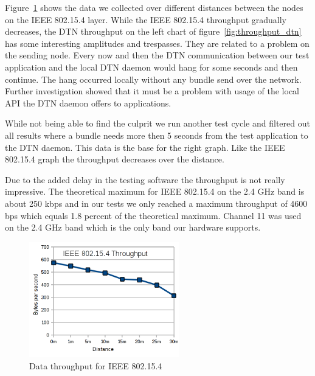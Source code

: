 Figure~\ref{fig:throughput} shows the data we collected over different distances
between the nodes on the IEEE 802.15.4 layer. While the IEEE 802.15.4 throughput
gradually decreases, the DTN throughput on the left chart of figure~\ref{fig:throughput_dtn}
has some interesting amplitudes and trespasses. They
are related to a problem on the sending node. Every now and then the DTN
communication between our test application and the local DTN daemon would hang
for some seconds and then continue. The hang occurred locally without any bundle
send over the network. Further investigation showed that it must be a problem
with usage of the local API the DTN daemon offers to applications.

While not being able to find the culprit we run another test  cycle and filtered
out all results where a bundle needs more then 5 seconds from the test
application to the DTN daemon. This data is the base for the right graph. Like
the IEEE 802.15.4 graph the throughput decreases over the distance.

Due to the added delay in the testing software the throughput is
not really impressive. The theoretical maximum for IEEE 802.15.4 on the 2.4 GHz
band is about 250 kbps and in our tests we only reached a maximum throughput of
4600 bps which equals 1.8 percent of the theoretical maximum. Channel 11 was used
on the 2.4 GHz band which is the only band our hardware supports.

\begin{figure}
  \begin{center}
    \includegraphics[width=6.5cm]{images/throughput_802154}
    \caption{Data throughput for IEEE 802.15.4}
    \label{fig:throughput}
  \end{center}
\end{figure}

